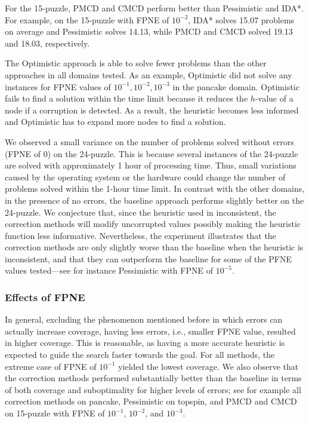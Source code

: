 \documentclass[letterpaper]{article}
\begin{document}
For the 15-puzzle, PMCD and CMCD perform better than Pessimistic and IDA*. For example, on the 15-puzzle with FPNE of $10^{-2}$, IDA* solves 15.07 problems on average and Pessimistic solves 14.13, while PMCD and CMCD solved 19.13 and 18.03, respectively.

The Optimistic approach is able to solve fewer problems than the other approaches in all domains tested. As an example, Optimistic did not solve any instances for FPNE values of $10^{-1}, 10^{-2}, 10^{-3}$ in the pancake domain. Optimistic fails to find a solution within the time limit because it reduces the $h$-value of a node if a corruption is detected. As a result, the heuristic becomes less informed and Optimistic has to expand more nodes
to find a solution.

We observed a small variance on the number of problems solved without errors (FPNE of $0$) on the 24-puzzle. %
This is because several instances of the 24-puzzle are solved with approximately 1 hour of processing time. Thus, small variations caused by the operating system or the hardware could change the number of problems solved within the 1-hour time limit. In contrast with the other domains, in the presence of no errors, the baseline approach performs slightly better on the 24-puzzle. We conjecture that, since the heuristic used in inconsistent, the correction methods will modify uncorrupted values possibly making the heuristic function less informative. Nevertheless, the experiment illustrates that the correction methods are only slightly worse than the baseline when the heuristic is inconsistent, and that they can outperform the baseline for some of the PFNE values tested---see for instance Pessimistic with FPNE of $10^{-5}$.

\subsubsection{Effects of FPNE}
In general, excluding the phenomenon mentioned before in which errors can actually increase coverage, having less errors, i.e., smaller FPNE value, resulted in higher coverage. This is reasonable, as having a more accurate heuristic is expected to guide the search faster towards the goal. For all methods, the extreme case of FPNE of $10^{-1}$ yielded the lowest coverage. We also observe that the correction methods performed substantially better than the baseline in terms of both coverage and suboptimality for higher levels of errors; see for example all correction methods on pancake, Pessimistic on topspin, and PMCD and CMCD on 15-puzzle with FPNE of $10^{-1}$, $10^{-2}$, and $10^{-3}$.
\end{document}
